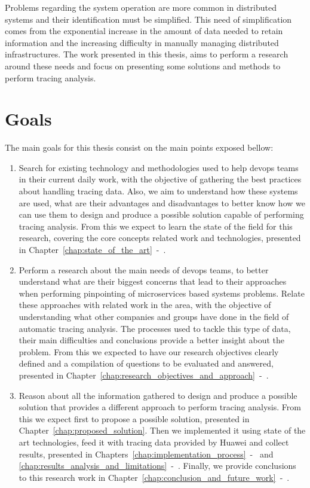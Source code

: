 Problems regarding the system operation are more common in distributed systems and their identification must be simplified. This need of simplification comes from the exponential increase in the amount of data needed to retain information and the increasing difficulty in manually managing distributed infrastructures. The work presented in this thesis, aims to perform a research around these needs and focus on presenting some solutions and methods to perform tracing analysis.

\section{Goals}
\label{sec:goals}

The main goals for this thesis consist on the main points exposed bellow:

\begin{enumerate}
    \item Search for existing technology and methodologies used to help \gls{devops} teams in their current daily work, with the objective of gathering the best practices about handling tracing data. Also, we aim to understand how these systems are used, what are their advantages and disadvantages to better know how we can use them to design and produce a possible solution capable of performing tracing analysis. From this we expect to learn the state of the field for this research, covering the core concepts related work and technologies, presented in Chapter~\ref{chap:state_of_the_art}~-~.
    \item Perform a research about the main needs of \gls{devops} teams, to better understand what are their biggest concerns that lead to their approaches when performing pinpointing of microservices based systems problems. Relate these approaches with related work in the area, with the objective of understanding what other companies and groups have done in the field of automatic tracing analysis. The processes used to tackle this type of data, their main difficulties and conclusions provide a better insight about the problem. From this we expected to have our research objectives clearly defined and a compilation of questions to be evaluated and answered, presented in Chapter~\ref{chap:research_objectives_and_approach}~-~.
    
    \item Reason about all the information gathered to design and produce a possible solution that provides a different approach to perform tracing analysis. From this we expect first to propose a possible solution, presented in Chapter~\ref{chap:proposed_solution}. Then we implemented it using state of the art technologies, feed it with tracing data provided by Huawei and collect results, presented in Chapters~\ref{chap:implementation_process}~-~ and \ref{chap:results_analysis_and_limitations}~-~. Finally, we provide conclusions to this research work in Chapter~\ref{chap:conclusion_and_future_work}~-~.
\end{enumerate}

